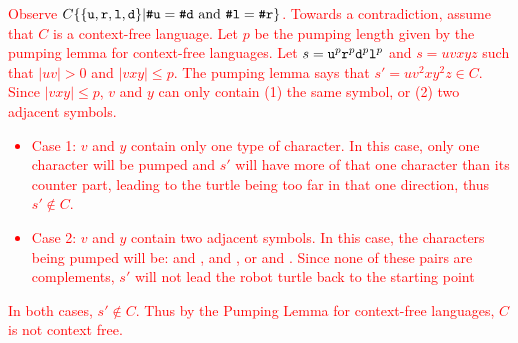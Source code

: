 \textcolor{red}{
    Observe $C\{\{\texttt{u},\texttt{r},\texttt{l},\texttt{d}\}|\texttt{\#u}=\texttt{\#d} \text{ and } \texttt{\#l}=\texttt{\#r}\}$. Towards a contradiction, assume that $C$ is a context-free language. Let $p$ be the pumping length given by the pumping lemma for context-free languages. Let $s=\texttt{u}^p\texttt{r}^p\texttt{d}^p\texttt{l}^p$ and $s=uvxyz$ such that $|uv|>0$ and $|vxy|\leq p$. The pumping lemma says that $s' = uv^2xy^2z \in C$. Since $|vxy|\leq p$, $v$ and $y$ can only contain (1) the same symbol, or (2) two adjacent symbols.
    \begin{itemize}
        \item [] Case 1: $v$ and $y$ contain only one type of character. In this case, only one character will be pumped and $s'$ will have more of that one character than its counter part, leading to the turtle being too far in that one direction, thus $s' \notin C$.
        \item [] Case 2: $v$ and $y$ contain two adjacent symbols. In this case, the characters being pumped will be:  and ,  and , or  and . Since none of these pairs are complements, $s'$ will not lead the robot turtle back to the starting point
    \end{itemize}
    In both cases, $s' \notin C$. Thus by the Pumping Lemma for context-free languages, $C$ is not context free.
}